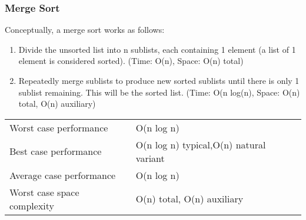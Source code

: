 \documentclass[main]{subfiles}
\begin{document}

\subsubsection{Merge Sort}
\renewcommand{\arraystretch}{1.5}


Conceptually, a merge sort works as follows:

\begin{enumerate}
\item Divide the unsorted list into n sublists, each containing 1 element (a list of 1 element is considered sorted). (Time: O(n), Space: O(n) total)
\item Repeatedly merge sublists to produce new sorted sublists until there is only 1 sublist remaining. This will be the sorted list. (Time: O(n log(n), Space: O(n) total, O(n) auxiliary)
\end{enumerate}

\begin{tabular}{ll}
Worst case performance & O(n log n)\\
Best case performance & O(n log n) typical,O(n) natural variant\\
Average case performance & O(n log n)\\
Worst case space complexity & O(n) total, O(n) auxiliary\\
\end{tabular}
\end{document}

